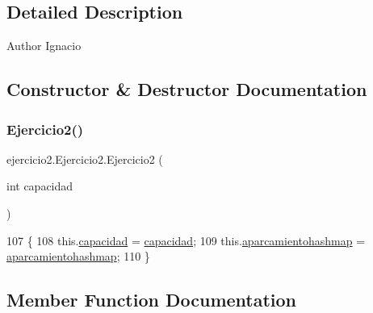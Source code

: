 \subsection{Detailed Description}
\begin{DoxyAuthor}{Author}
Ignacio 
\end{DoxyAuthor}


\subsection{Constructor \& Destructor Documentation}
\mbox{\label{classejercicio2_1_1_ejercicio2_a446f9b7f84e776b6fd05f60a9e97f3be}} 
\subsubsection{\texorpdfstring{Ejercicio2()}{Ejercicio2()}}
{\footnotesize\ttfamily ejercicio2.\+Ejercicio2.\+Ejercicio2 (\begin{DoxyParamCaption}\item[{int}]{capacidad }\end{DoxyParamCaption})\hspace{0.3cm}{\ttfamily [inline]}}


\begin{DoxyCode}
107                                     \{
108         this.\mbox{\hyperlink{classejercicio2_1_1_ejercicio2_a67160aed137820bd3e65ebd3a709ace7}{capacidad}} = \mbox{\hyperlink{classejercicio2_1_1_ejercicio2_a67160aed137820bd3e65ebd3a709ace7}{capacidad}};
109         this.\mbox{\hyperlink{classejercicio2_1_1_ejercicio2_aa5edc1e53d504e830b43940e31c3f33a}{aparcamientohashmap}} = \mbox{\hyperlink{classejercicio2_1_1_ejercicio2_aa5edc1e53d504e830b43940e31c3f33a}{aparcamientohashmap}};
110     \}
\end{DoxyCode}


\subsection{Member Function Documentation}
\mbox{\label{classejercicio2_1_1_ejercicio2_aa1233af33b5de9cc49f3e2675057450a}} 

